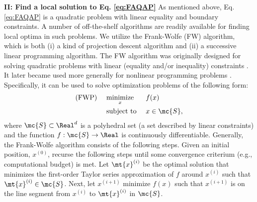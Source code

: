 \documentclass[10pt,journal,cspaper,compsoc]{IEEEtran}
\begin{document}
\textbf{II: Find a local solution to Eq. \eqref{eq:FAQAP}} As mentioned above, Eq. \eqref{eq:FAQAP} is a quadratic problem with linear equality and boundary constraints.  A number of off-the-shelf algorithms are readily available for finding local optima in such problems.  We utilize the Frank-Wolfe (FW) algorithm, which is both (i) a kind of projection descent algorithm
and (ii) a successive linear programming algorithm.  The FW algorithm was originally designed for solving quadratic problems with linear (equality and/or inequality) constraints \cite{Frank1956}. It later became used more generally for nonlinear programming problems  \cite{Bradley1977}.  Specifically, it can be used to solve optimization problems of the following form:
\begin{subequations} \label{eq:FW}
\begin{align}
		\text{(FWP) } \quad &\underset{x}{\text{minimize}}  && f(x)  \\
		&\text{subject to } && x \in \mc{S},
\end{align}
\end{subequations}
where $\mc{S} \subset \Real^d$ is a polyhedral set (a set described by linear constraints) and the function $f: \mc{S} \to \Real$ is continuously differentiable.  Generally, the Frank-Wolfe algorithm consists of the following steps.  Given an initial position, $x^{(0)}$, recurse the following steps until some convergence criterium (e.g., computational budget) is met.  Let $\mt{x}^{(i)}$ be the optimal solution that minimizes the first-order Taylor series approximation of $f$ around $x^{(i)}$ such that  $\mt{x}^{(i)} \in \mc{S}$.  Next, let $x^{(i+1)}$ minimize $f(x)$ such that $x^{(i+1)}$ is on the line segment from $x^{(i)}$ to $\mt{x}^{(i)}$ in $\mc{S}$.  
\end{document}
